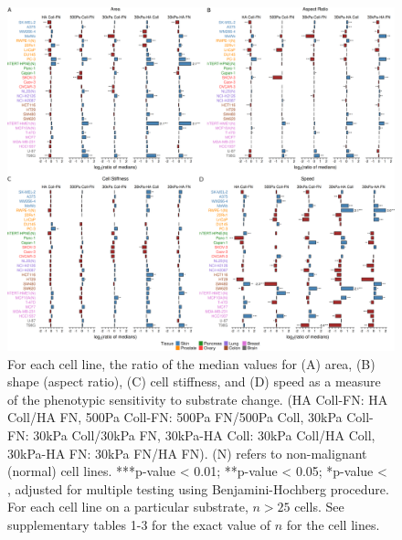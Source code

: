 \documentclass[11pt,letterpaper,english,oneside]{article} %
\begin{document}
\begin{figure}[H]
    \hspace*{-2cm}
    \centering
    \includegraphics[scale=0.13]{../Figures/Supplementary_Figure2/supplementary_figure2.png}
    \caption{For each cell line, the ratio of the median values for (A) area, (B) shape (aspect ratio), (C) cell stiffness, and (D) speed as a measure of the phenotypic sensitivity to substrate change. 
    (HA Coll-FN: HA Coll/HA FN, 500Pa Coll-FN: 500Pa FN/500Pa Coll, 30kPa Coll-FN: 30kPa Coll/30kPa FN, 30kPa-HA Coll: 30kPa Coll/HA Coll, 30kPa-HA FN: 30kPa FN/HA FN). (N) refers to non-malignant (normal) cell lines. 
    ***p-value < 0.01; **p-value < 0.05; *p-value < , adjusted for multiple testing using Benjamini-Hochberg procedure. For each cell line on a particular substrate, $n > 25$ cells. See supplementary tables 1-3 for the exact value of $n$ for the cell lines.}
    \label{fig:fig2}
\end{figure}
\end{document}
